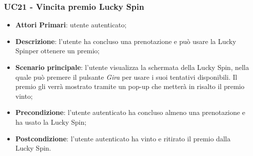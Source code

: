 \subsubsection{UC21 - Vincita premio Lucky Spin}
\begin{itemize}
	\item \textbf{Attori Primari}: utente autenticato;
	\item \textbf{Descrizione}: l'utente ha concluso una prenotazione e può usare la Lucky Spin\glosp per ottenere un premio;	
	\item \textbf{Scenario principale}: l'utente visualizza la schermata della Lucky Spin, nella quale può premere il pulsante \textit{Gira} per usare i suoi tentativi disponibili. Il premio gli verrà mostrato tramite un pop-up che metterà in risalto il premio vinto;
	\item \textbf{Precondizione}: l'utente autenticato ha concluso almeno una prenotazione e ha usato la Lucky Spin;
	\item \textbf{Postcondizione}: l'utente autenticato ha vinto e ritirato il premio dalla Lucky Spin.
\end{itemize}
